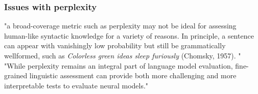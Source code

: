 \subsubsection{Issues with perplexity}







"a broad-coverage metric such as perplexity may not be ideal for assessing human-like syntactic knowledge for a variety of reasons. In principle, a sentence can appear with vanishingly low probability but still be grammatically wellformed, such as \textit{Colorless green ideas sleep furiously} (Chomsky, 1957).  "  \citep{hu2020systematic}
"While perplexity remains an integral part of language model evaluation, fine-grained linguistic assessment can provide both more challenging and more interpretable tests to evaluate neural models."  \citep{hu2020systematic}


